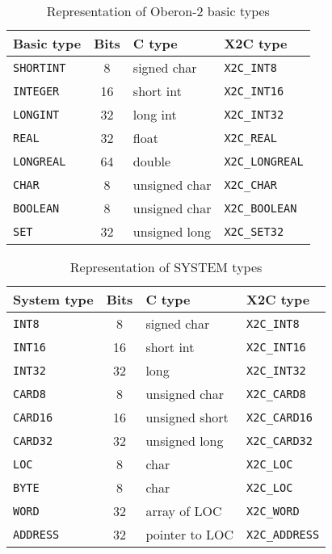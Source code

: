 \begin{table}[htbp]
\begin{center}
\begin{tabular}{|l|c|l|l|} \hline
\bf Basic type &\bf Bits  &\bf C type  & \bf X2C type \\ \hline
\tt SHORTINT   & 8     & signed char   & \verb+X2C_INT8+ \\
\tt INTEGER    & 16    & short int     & \verb+X2C_INT16+ \\
\tt LONGINT    & 32    & long int      & \verb+X2C_INT32+ \\
\tt REAL       & 32    & float         & \verb+X2C_REAL+ \\
\tt LONGREAL   & 64    & double        & \verb+X2C_LONGREAL+ \\
\tt CHAR       & 8     & unsigned char & \verb+X2C_CHAR+ \\
\tt BOOLEAN    & 8     & unsigned char & \verb+X2C_BOOLEAN+ \\
\tt SET        & 32    & unsigned long & \verb+X2C_SET32+ \\
\hline
\end{tabular}
\end{center}
\caption{Representation of Oberon-2 basic types}\label{table:o2:C}
\end{table}

\begin{table}[htbp]
\begin{center}
\begin{tabular}{|l|c|l|l|} \hline
\bf System type & \bf Bits  &\bf C type  & \bf X2C type \\ \hline
\tt INT8        & 8     & signed char    & \verb+X2C_INT8+ \\
\tt INT16       & 16    & short int      & \verb+X2C_INT16+ \\
\tt INT32       & 32    & long           & \verb+X2C_INT32+ \\
\tt CARD8       & 8     & unsigned char  & \verb+X2C_CARD8+ \\
\tt CARD16      & 16    & unsigned short & \verb+X2C_CARD16+ \\
\tt CARD32      & 32    & unsigned long  & \verb+X2C_CARD32+ \\
\tt LOC         & 8     & char           & \verb+X2C_LOC+ \\
\tt BYTE        & 8     & char           & \verb+X2C_LOC+ \\
\tt WORD        & 32    & array of LOC   & \verb+X2C_WORD+ \\
\tt ADDRESS     & 32    & pointer to LOC & \verb+X2C_ADDRESS+ \\
\hline
\end{tabular}
\end{center}
\caption{Representation of SYSTEM types}\label{table:SYSTEM:C}
\end{table}

